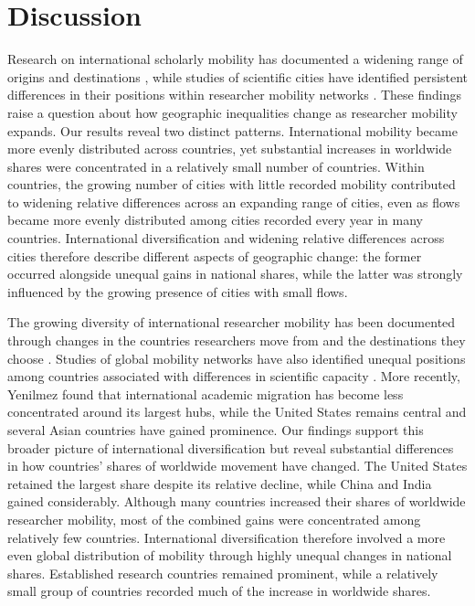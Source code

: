 \section{Discussion}

Research on international scholarly mobility has documented a widening range of origins and destinations \cite{ref008,yenilmez2026}, while studies of scientific cities have identified persistent differences in their positions within researcher mobility networks \cite{ref031,ref032}. These findings raise a question about how geographic inequalities change as researcher mobility expands. Our results reveal two distinct patterns. International mobility became more evenly distributed across countries, yet substantial increases in worldwide shares were concentrated in a relatively small number of countries. Within countries, the growing number of cities with little recorded mobility contributed to widening relative differences across an expanding range of cities, even as flows became more evenly distributed among cities recorded every year in many countries. International diversification and widening relative differences across cities therefore describe different aspects of geographic change: the former occurred alongside unequal gains in national shares, while the latter was strongly influenced by the growing presence of cities with small flows.

The growing diversity of international researcher mobility has been documented through changes in the countries researchers move from and the destinations they choose \cite{ref008,ref039}. Studies of global mobility networks have also identified unequal positions among countries associated with differences in scientific capacity \cite{ref009}. More recently, Yenilmez \cite{yenilmez2026} found that international academic migration has become less concentrated around its largest hubs, while the United States remains central and several Asian countries have gained prominence. Our findings support this broader picture of international diversification but reveal substantial differences in how countries' shares of worldwide movement have changed. The United States retained the largest share despite its relative decline, while China and India gained considerably. Although many countries increased their shares of worldwide researcher mobility, most of the combined gains were concentrated among relatively few countries. International diversification therefore involved a more even global distribution of mobility through highly unequal changes in national shares. Established research countries remained prominent, while a relatively small group of countries recorded much of the increase in worldwide shares.

